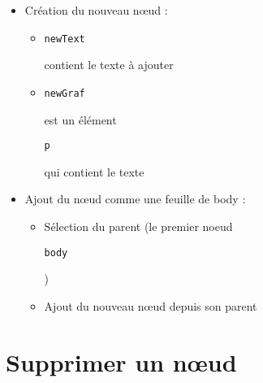 \begin{itemize}
\tightlist
\item
  Création du nouveau nœud :

  \begin{itemize}
  \tightlist
  \item
    \begin{otherlanguage}{english}\texttt{newText}\end{otherlanguage}
    contient le texte à ajouter
  \item
    \begin{otherlanguage}{english}\texttt{newGraf}\end{otherlanguage}
    est un élément
    \begin{otherlanguage}{english}\texttt{p}\end{otherlanguage} qui
    contient le texte
  \end{itemize}
\item
  Ajout du nœud comme une feuille de body :

  \begin{itemize}
  \tightlist
  \item
    Sélection du parent (le premier noeud
    \begin{otherlanguage}{english}\texttt{body}\end{otherlanguage})
  \item
    Ajout du nouveau nœud depuis son parent
  \end{itemize}
\end{itemize}

\hypertarget{supprimer-un-nux153ud}{%
\section{Supprimer un nœud}\label{supprimer-un-nux153ud}}

